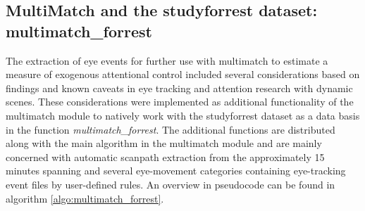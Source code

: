 \documentclass[a4paper, 12pt]{scrreprt}
\begin{document}
\subsection{MultiMatch and the studyforrest dataset: multimatch\_forrest}
The extraction of eye events for further use with multimatch to estimate a measure of exogenous attentional control included several considerations based on findings and known caveats in eye tracking and attention research with dynamic scenes. These considerations were implemented as additional functionality of the multimatch module to natively work with the studyforrest dataset as a data basis in the function \textit{multimatch\_forrest}. The additional functions are distributed along with the main algorithm in the multimatch module and are mainly concerned with automatic scanpath extraction from the approximately 15 minutes spanning and several eye-movement categories containing eye-tracking event files by user-defined rules. An overview in pseudocode can be found in algorithm \ref{algo:multimatch_forrest}. \newline
\end{document}
